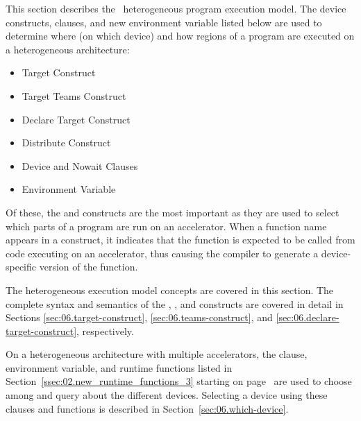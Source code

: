 This section describes the \OMP\ heterogeneous program execution model.
The device constructs, clauses, and new environment variable
listed below are used to determine where (on which device) and how regions of a
program are executed on a heterogeneous architecture: 

\begin{itemize}
  \item Target Construct
  \item Target Teams Construct
  \item Declare Target Construct
  \item Distribute Construct
  \item Device and Nowait Clauses
  \item {} Environment Variable
\end{itemize}

Of these, the  and  constructs are the
most important as they are used to select which parts of a program are run on
an accelerator.  When a function name appears in a 
construct, it indicates that the function is expected to be called from code
executing on an accelerator, thus causing the compiler to generate a
device-specific version of the function.  

The heterogeneous execution model concepts are covered in this section.  The
complete syntax and semantics of the , , and
 constructs are covered in detail in Sections
\ref{sec:06.target-construct}, \ref{sec:06.teams-construct}, and
\ref{sec:06.declare-target-construct}, respectively.

On a heterogeneous architecture with
multiple accelerators, the  clause, 
environment variable, and runtime functions listed in 
Section~\ref{ssec:02.new_runtime_functions_3} starting on
page~\pageref{ssec:02.new_runtime_functions_3}  
are used to choose among and query about the different devices.  
Selecting a device using these clauses and functions is described in 
Section~\ref{sec:06.which-device}.

